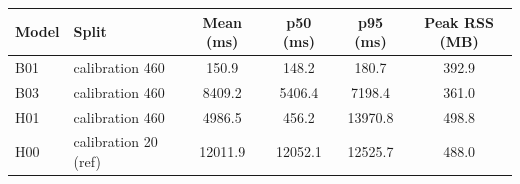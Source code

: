 \begin{tabular}{llcccc}
\hline
Model & Split & Mean (ms) & p50 (ms) & p95 (ms) & Peak RSS (MB) \\
\hline
B01 & calibration 460 & 150.9 & 148.2 & 180.7 & 392.9 \\
B03 & calibration 460 & 8409.2 & 5406.4 & 7198.4 & 361.0 \\
H01 & calibration 460 & 4986.5 & 456.2 & 13970.8 & 498.8 \\
H00 & calibration 20 (ref) & 12011.9 & 12052.1 & 12525.7 & 488.0 \\
\hline
\end{tabular}

